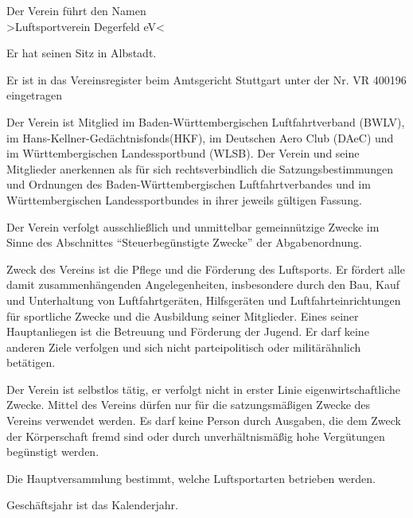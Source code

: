 \documentclass[11pt,a4paper,parskip=half]{scrartcl}
\begin{document}
	\begin{contract}
		\begin{multicols}{2}

		Der Verein führt den Namen\\
		>Luftsportverein Degerfeld eV<

    Er hat seinen Sitz in Albstadt.

		Er ist in das Vereinsregister beim Amtsgericht Stuttgart unter der Nr. VR 400196 eingetragen

		Der Verein ist Mitglied im Baden-Württembergischen Luftfahrtverband (BWLV),
    im Hans-Kellner-Gedächtnisfonds(HKF),
    im Deutschen Aero Club (DAeC) und im Württembergischen Landessportbund (WLSB).
		Der Verein und seine	Mitglieder anerkennen als für sich rechtsverbindlich die Satzungsbestimmungen und	Ordnungen des Baden-Württembergischen Luftfahrtverbandes und im Württembergischen Landessportbundes in ihrer jeweils gültigen Fassung.

		Der Verein verfolgt ausschließlich und unmittelbar gemeinnützige Zwecke im Sinne des Abschnittes "`Steuerbegünstigte Zwecke"' der Abgabenordnung.

		Zweck des Vereins ist die Pflege und die Förderung des Luftsports.
		Er fördert alle damit	zusammenhängenden Angelegenheiten,
    insbesondere durch den Bau,
    Kauf und Unterhaltung von Luftfahrtgeräten,
    Hilfsgeräten	und Luftfahrteinrichtungen für sportliche Zwecke und die Ausbildung seiner Mitglieder.
		Eines seiner Hauptanliegen ist die Betreuung und Förderung der Jugend.
		Er darf keine anderen Ziele verfolgen und sich nicht parteipolitisch oder militärähnlich betätigen.

		Der Verein ist selbstlos tätig,
    er verfolgt nicht in erster Linie eigenwirtschaftliche Zwecke.
		Mittel des Vereins dürfen nur für die satzungsmäßigen Zwecke des Vereins verwendet werden. Es darf keine Person durch Ausgaben,
    die dem Zweck der Körperschaft fremd sind oder durch unverhältnismäßig hohe Vergütungen begünstigt werden.

		Die Hauptversammlung bestimmt,
    welche Luftsportarten betrieben werden.

		Geschäftsjahr ist das Kalenderjahr.



\end{multicols}
\end{contract}
\end{document}
